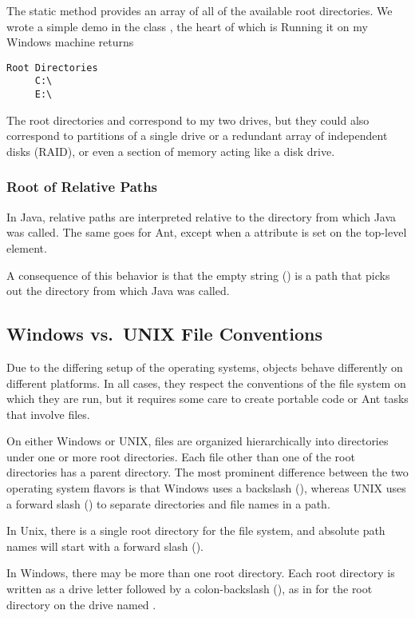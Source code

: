 The static method  provides an array of all of
the available root directories.  We wrote a simple demo in the
class , the heart of which is
%
%
Running it on my Windows machine returns
%
\begin{verbatim}
Root Directories
     C:\
     E:\
\end{verbatim}
%
The root directories  and  correspond to my
two drives, but they could also correspond to partitions of a single
drive or a redundant array of independent disks (RAID), or even a
section of memory acting like a disk drive.

\subsubsection{Root of Relative Paths}

In Java, relative paths are interpreted relative to the directory from
which Java was called.  The same goes for Ant, except when a 
attribute is set on the top-level \code{project} element.  

A consequence of this behavior is that the empty string () is
a path that picks out the directory from which Java was called.


\subsection{Windows vs.\ UNIX File Conventions}

Due to the differing setup of the operating systems, 
objects behave differently on different platforms.  In all cases, they
respect the conventions of the file system on which they are run, but
it requires some care to create portable code or Ant tasks that involve
files.

On either Windows or UNIX, files are organized hierarchically into
directories under one or more root directories.  Each file other
than one of the root directories has a parent directory.  The most
prominent difference between the two operating system flavors is
that Windows uses a backslash (\code{\bk}), whereas UNIX uses
a forward slash (\code{/}) to separate directories and file names
in a path.

In Unix, there is a single root directory for the file system, and
absolute path names will start with a forward slash (\code{/}).  

In Windows, there may be more than one root directory.  Each root
directory is written as a drive letter followed by a colon-backslash
(\code{:\bk}), as in \code{C:\bk} for the root directory on the drive
named \code{C}.  


